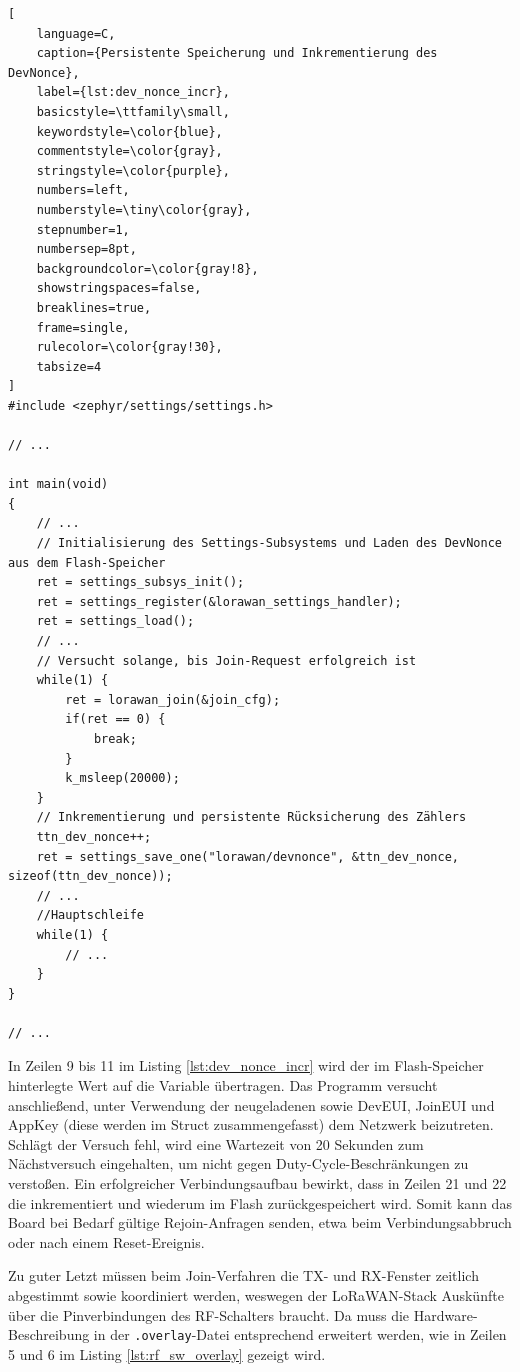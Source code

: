 \begin{lstlisting}[
    language=C,
    caption={Persistente Speicherung und Inkrementierung des DevNonce},
    label={lst:dev_nonce_incr},
    basicstyle=\ttfamily\small,
    keywordstyle=\color{blue},
    commentstyle=\color{gray},
    stringstyle=\color{purple},
    numbers=left,
    numberstyle=\tiny\color{gray},
    stepnumber=1,
    numbersep=8pt,
    backgroundcolor=\color{gray!8},
    showstringspaces=false,
    breaklines=true,
    frame=single,
    rulecolor=\color{gray!30},
    tabsize=4
]
#include <zephyr/settings/settings.h>

// ...

int main(void)
{
    // ...
    // Initialisierung des Settings-Subsystems und Laden des DevNonce aus dem Flash-Speicher
    ret = settings_subsys_init();
    ret = settings_register(&lorawan_settings_handler);
    ret = settings_load(); 
    // ...
    // Versucht solange, bis Join-Request erfolgreich ist 
    while(1) {
        ret = lorawan_join(&join_cfg);
		if(ret == 0) {
			break;
        }
        k_msleep(20000); 
	}
    // Inkrementierung und persistente Rücksicherung des Zählers
    ttn_dev_nonce++;
    ret = settings_save_one("lorawan/devnonce", &ttn_dev_nonce, sizeof(ttn_dev_nonce));
    // ... 
    //Hauptschleife
    while(1) {
        // ... 
    }
}

// ...
\end{lstlisting}

In Zeilen 9 bis 11 im Listing \ref{lst:dev_nonce_incr} wird der im Flash-Speicher hinterlegte Wert auf die Variable 
übertragen. Das Programm versucht anschließend, unter Verwendung der neugeladenen  sowie DevEUI, JoinEUI und AppKey 
(diese werden im Struct  zusammengefasst) dem Netzwerk beizutreten. Schlägt der Versuch fehl, wird eine Wartezeit von 20 Sekunden
zum Nächstversuch eingehalten, um nicht gegen Duty-Cycle-Beschränkungen zu verstoßen. Ein erfolgreicher Verbindungsaufbau bewirkt,
dass in Zeilen 21 und 22 die  inkrementiert und wiederum im Flash zurückgespeichert wird. 
Somit kann das Board bei Bedarf gültige Rejoin-Anfragen senden, etwa beim Verbindungsabbruch oder nach einem Reset-Ereignis. 

Zu guter Letzt müssen beim Join-Verfahren die TX- und RX-Fenster zeitlich abgestimmt sowie koordiniert werden, weswegen 
der LoRaWAN-Stack Auskünfte über die Pinverbindungen des RF-Schalters braucht. Da muss die Hardware-Beschreibung in der 
\verb|.overlay|-Datei entsprechend erweitert werden, wie in Zeilen 5 und 6 im Listing \ref{lst:rf_sw_overlay} gezeigt wird. 

